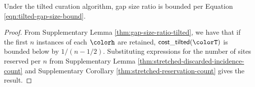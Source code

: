 \begin{theorem}
\label{thm:tilted-gap-size}
Under the tilted curation algorithm, gap size ratio is bounded per Equation \ref{eqn:tilted-gap-size-bound}.
\end{theorem}
\begin{proof}

From Supplementary Lemma \ref{thm:gap-size-ratio-tilted}, we have that if the first $n$ instances of each \hv{} $\colorh$ are retained, $\mathsf{cost\_tilted}(\colorT)$ is bounded below by $1/(n - 1/2)$.
Substituting expressions for the number of sites reserved per \hv{} $n$ from Supplementary Lemma \ref{thm:stretched-discarded-incidence-count} and Supplementary Corollary \ref{thm:stretched-reservation-count} gives the result.
\end{proof}
